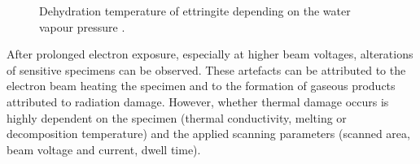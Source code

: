 \begin{figure}[!htb]
    \caption{
        Dehydration temperature of ettringite depending on the water vapour pressure \cite{zhou.2001}.
    }
    \label{fig:ettringite_dehydration}
\end{figure}


After prolonged electron exposure, especially at higher beam voltages, alterations of sensitive specimens can be observed.
These artefacts can be attributed to the electron beam heating the specimen and to the formation of gaseous products attributed to radiation damage.
However, whether thermal damage occurs is highly dependent on the specimen (thermal conductivity, melting or decomposition temperature) and the applied scanning parameters (scanned area, beam voltage and current, dwell time). \cite{reimer.1998b}

